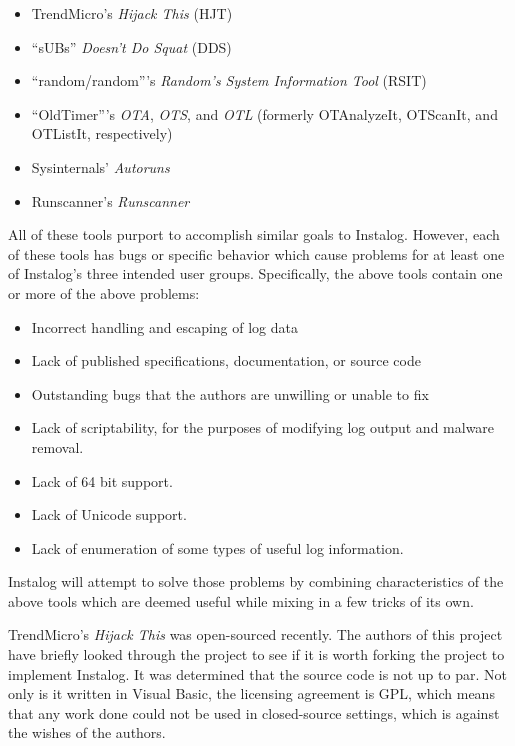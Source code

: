 \documentclass[letterpaper,12pt]{article}
\begin{document}
\begin{itemize}
    \item TrendMicro's {\em Hijack This} (HJT)
    \item ``sUBs'' {\em Doesn't Do Squat} (DDS)
    \item ``random/random'''s {\em Random's System Information Tool} (RSIT)
    \item ``OldTimer'''s {\em OTA}, {\em OTS}, and {\em OTL} (formerly
    OTAnalyzeIt, OTScanIt, and OTListIt, respectively)
    \item Sysinternals' {\em Autoruns}
    \item Runscanner's {\em Runscanner}
\end{itemize}

All of these tools purport to accomplish similar goals to Instalog. However,
each of these tools has bugs or specific behavior which cause problems for at
least one of Instalog's three intended user groups.  Specifically, the above
tools contain one or more of the above problems:

\begin{itemize}
    \item Incorrect handling and escaping of log data
    \item Lack of published specifications, documentation, or source code
    \item Outstanding bugs that the authors are unwilling or unable to fix
    \item Lack of scriptability, for the purposes of modifying log output and
    malware removal.
    \item Lack of 64 bit support.
    \item Lack of Unicode support.
    \item Lack of enumeration of some types of useful log information.
\end{itemize}

Instalog will attempt to solve those problems by combining characteristics of
the above tools which are deemed useful while mixing in a few tricks of its
own.

TrendMicro's {\em Hijack This} was open-sourced recently.  The authors of this
project have briefly looked through the project to see if it is worth forking
the project to implement Instalog.  It was determined that the source code is
not up to par.  Not only is it written in Visual Basic, the licensing agreement
is GPL, which means that any work done could not be used in closed-source
settings, which is against the wishes of the authors.
\end{document}
